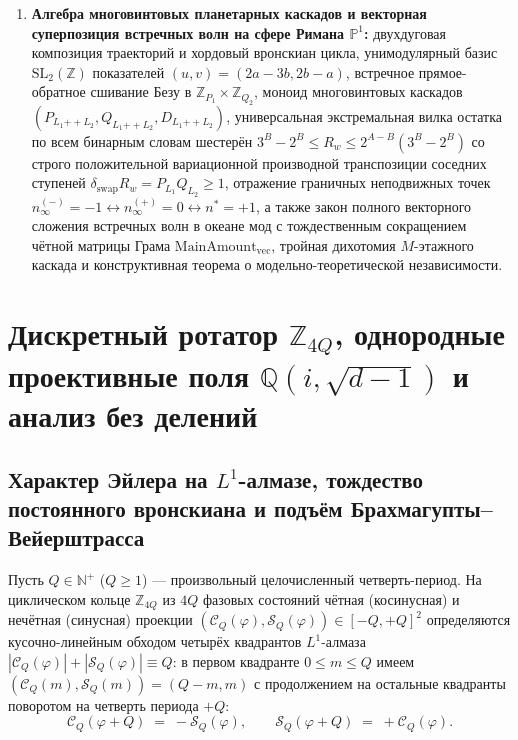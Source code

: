 \begin{enumerate}[label=\textbf{Глава \arabic*.},leftmargin=*]
\item \textbf{Алгебра многовинтовых планетарных каскадов и векторная суперпозиция встречных волн на сфере Римана $\mathbb{P}^1$:}
  двухдуговая композиция траекторий и хордовый вронскиан цикла, унимодулярный базис $\mathrm{SL}_2(\mathbb{Z})$ показателей $(u,v) = (2a-3b, 2b-a)$, встречное прямое-обратное сшивание Безу в $\mathbb{Z}_{P_1}\times\mathbb{Z}_{Q_2}$, моноид многовинтовых каскадов $(P_{L_1\mathbin{+\!+}L_2}, Q_{L_1\mathbin{+\!+}L_2}, D_{L_1\mathbin{+\!+}L_2})$, универсальная экстремальная вилка остатка по всем бинарным словам шестерён $3^B - 2^B \le R_w \le 2^{A-B}(3^B - 2^B)$ со строго положительной вариационной производной транспозиции соседних ступеней $\delta_{\mathrm{swap}}R_w = P_{L_1}Q_{L_2} \ge 1$, отражение граничных неподвижных точек $n_\infty^{(-)} = -1 \leftrightarrow n_\infty^{(+)} = 0 \leftrightarrow n^* = +1$, а также закон полного векторного сложения встречных волн в океане мод с тождественным сокращением чётной матрицы Грама $\mathrm{MainAmount}_{\mathrm{vec}}$, тройная дихотомия $M$-этажного каскада и конструктивная теорема о модельно-теоретической независимости.
\end{enumerate}

\chapter{Дискретный ротатор \texorpdfstring{$\mathbb{Z}_{4Q}$}{Z4Q}, однородные проективные поля \texorpdfstring{$\mathbb{Q}(i,\sqrt{d-1})$}{Q(i, sqrt(d-1))} и анализ без делений}
\label{ch:math-rotator-calculus}

\section{Характер Эйлера на \texorpdfstring{$L^1$}{L1}-алмазе, тождество постоянного вронскиана и подъём Брахмагупты--Вейерштрасса}

Пусть $Q \in \mathbb{N}^+$ ($Q \ge 1$) --- произвольный целочисленный четверть-период. На циклическом кольце $\mathbb{Z}_{4Q}$ из $4Q$ фазовых состояний чётная (косинусная) и нечётная (синусная) проекции $(\mathcal{C}_Q(\varphi), \mathcal{S}_Q(\varphi)) \in [-Q, +Q]^2$ определяются кусочно-линейным обходом четырёх квадрантов $L^1$-алмаза $|\mathcal{C}_Q(\varphi)| + |\mathcal{S}_Q(\varphi)| \equiv Q$: в первом квадранте $0 \le m \le Q$ имеем $(\mathcal{C}_Q(m), \mathcal{S}_Q(m)) = (Q - m, m)$ с продолжением на остальные квадранты поворотом на четверть периода $+Q$:
\begin{equation}
  \label{eq:math-rotator-quarter-shift}
  \mathcal{C}_Q(\varphi + Q) \;=\; -\mathcal{S}_Q(\varphi), \qquad
  \mathcal{S}_Q(\varphi + Q) \;=\; +\mathcal{C}_Q(\varphi).
\end{equation}


